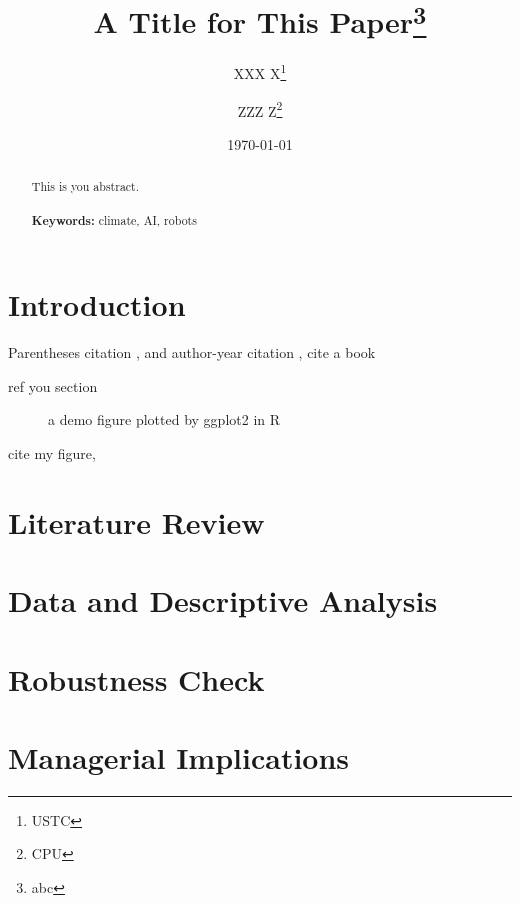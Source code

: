 \documentclass[a4paper, 12pt]{article}
\begin{document}
\begin{titlepage}
    \title{A Title for This Paper\thanks{abc}}
    \author{XXX X\thanks{USTC} \and ZZZ  Z\thanks{CPU}}
    \date{\today}
    \maketitle
    \begin{abstract}
        \noindent 
        This is you abstract.
        \\
        \vspace{0in}\\
        \noindent\textbf{Keywords:} climate, AI, robots\\
        \bigskip
    \end{abstract}
    \setcounter{page}{0}
    \thispagestyle{empty}
\end{titlepage}
\pagebreak \newpage
\doublespacing

\section{Introduction}\label{sec:intro}
Parentheses citation \citep{DunningHuchetteLubin2017,DunningHuchetteLubin2017}, and author-year citation \citet{DunningHuchetteLubin2017}, cite a book \citep[\S 2.1.1]{DunningHuchetteLubin2017}

ref you section 
\begin{figure}
\centering


\caption{a demo figure plotted by ggplot2 in R}
\label{fig:demo}
\end{figure}
cite my figure, 
\section{Literature Review}
\section{Data and Descriptive Analysis}
\section{Robustness Check}
\section{Managerial Implications}
\end{document}
